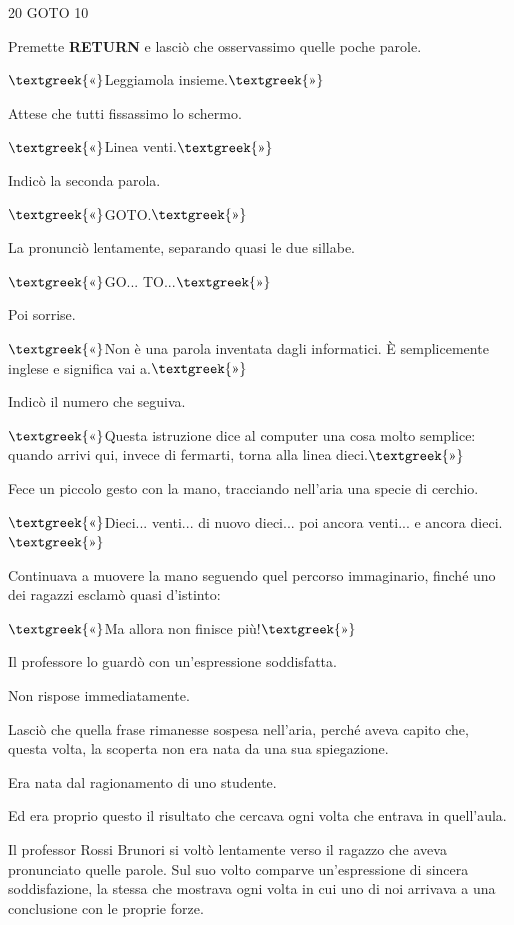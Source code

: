 \documentclass{article}
\begin{document}
20 GOTO 10

Premette \textbf{RETURN} e lasciò che osservassimo quelle poche parole.

$\text{\textgreek{«}}$Leggiamola insieme.$\text{\textgreek{»}}$

Attese che tutti fissassimo lo schermo.

$\text{\textgreek{«}}$Linea venti.$\text{\textgreek{»}}$

Indicò la seconda parola.

$\text{\textgreek{«}}$GOTO.$\text{\textgreek{»}}$

La pronunciò lentamente, separando quasi le due sillabe.

$\text{\textgreek{«}}$GO... TO...$\text{\textgreek{»}}$

Poi sorrise.

$\text{\textgreek{«}}$Non è una parola inventata dagli informatici. È semplicemente inglese e significa
{\textquotedbl}vai a{\textquotedbl}.$\text{\textgreek{»}}$

Indicò il numero che seguiva.

$\text{\textgreek{«}}$Questa istruzione dice al computer una cosa molto semplice: quando arrivi qui, invece di fermarti,
torna alla linea dieci.$\text{\textgreek{»}}$

Fece un piccolo gesto con la mano, tracciando nell'aria una specie di cerchio.

$\text{\textgreek{«}}$Dieci... venti... di nuovo dieci... poi ancora venti... e ancora dieci.$\text{\textgreek{»}}$

Continuava a muovere la mano seguendo quel percorso immaginario, finché uno dei ragazzi esclamò quasi d'istinto:

$\text{\textgreek{«}}$Ma allora non finisce più!$\text{\textgreek{»}}$

Il professore lo guardò con un'espressione soddisfatta.

Non rispose immediatamente.

Lasciò che quella frase rimanesse sospesa nell'aria, perché aveva capito che, questa volta, la scoperta non era nata da
una sua spiegazione.

Era nata dal ragionamento di uno studente.

Ed era proprio questo il risultato che cercava ogni volta che entrava in quell'aula.

Il professor Rossi Brunori si voltò lentamente verso il ragazzo che aveva pronunciato quelle parole. Sul suo volto
comparve un'espressione di sincera soddisfazione, la stessa che mostrava ogni volta in cui uno di noi arrivava a una
conclusione con le proprie forze.
\end{document}
